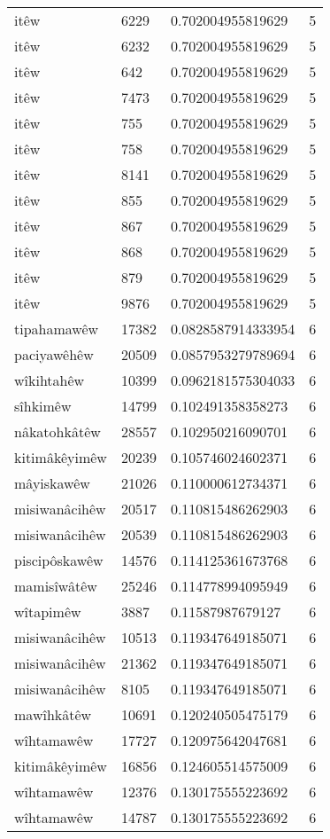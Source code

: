 \begin{longtable}{llll}
itêw & 6229 & 0.702004955819629 & 5\\
itêw & 6232 & 0.702004955819629 & 5\\
itêw & 642 & 0.702004955819629 & 5\\
itêw & 7473 & 0.702004955819629 & 5\\
itêw & 755 & 0.702004955819629 & 5\\
itêw & 758 & 0.702004955819629 & 5\\
itêw & 8141 & 0.702004955819629 & 5\\
itêw & 855 & 0.702004955819629 & 5\\
itêw & 867 & 0.702004955819629 & 5\\
itêw & 868 & 0.702004955819629 & 5\\
itêw & 879 & 0.702004955819629 & 5\\
itêw & 9876 & 0.702004955819629 & 5\\
tipahamawêw & 17382 & 0.0828587914333954 & 6\\
paciyawêhêw & 20509 & 0.0857953279789694 & 6\\
wîkihtahêw & 10399 & 0.0962181575304033 & 6\\
sîhkimêw & 14799 & 0.102491358358273 & 6\\
nâkatohkâtêw & 28557 & 0.102950216090701 & 6\\
kitimâkêyimêw & 20239 & 0.105746024602371 & 6\\
mâyiskawêw & 21026 & 0.110000612734371 & 6\\
misiwanâcihêw & 20517 & 0.110815486262903 & 6\\
misiwanâcihêw & 20539 & 0.110815486262903 & 6\\
piscipôskawêw & 14576 & 0.114125361673768 & 6\\
mamisîwâtêw & 25246 & 0.114778994095949 & 6\\
wîtapimêw & 3887 & 0.11587987679127 & 6\\
misiwanâcihêw & 10513 & 0.119347649185071 & 6\\
misiwanâcihêw & 21362 & 0.119347649185071 & 6\\
misiwanâcihêw & 8105 & 0.119347649185071 & 6\\
mawîhkâtêw & 10691 & 0.120240505475179 & 6\\
wîhtamawêw & 17727 & 0.120975642047681 & 6\\
kitimâkêyimêw & 16856 & 0.124605514575009 & 6\\
wîhtamawêw & 12376 & 0.130175555223692 & 6\\
wîhtamawêw & 14787 & 0.130175555223692 & 6\\

\end{longtable}
